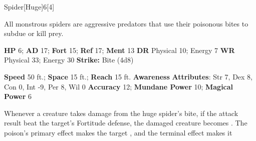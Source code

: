   \begin{monsection}{Spider}[Huge]{6}[4]
    \vspace{-1em}\vspace{-1em}
    \vspace{0em}

    
    All monstrous spiders are aggressive predators that use their poisonous bites to subdue or kill prey.
  

    \begin{spellcontent}
      \begin{spelltargetinginfo}
        \pari \textbf{HP} 6;
          \textbf{AD} 17;
          \textbf{Fort} 15;
          \textbf{Ref} 17;
          \textbf{Ment} 13
        \pari \textbf{DR} Physical 10; Energy 7
        \pari \textbf{WR} Physical 33; Energy 30
        \pari \textbf{Strike:}
            Bite  (4d8)
      \end{spelltargetinginfo}
    \end{spellcontent}
    \begin{monsterfooter}
      \pari \textbf{Speed} 50 ft.;
        \textbf{Space} 15 ft.;
        \textbf{Reach} 15 ft.
      \pari \textbf{Awareness} 
      \pari \textbf{Attributes}:
        Str 7, Dex 8,
        Con 0, Int -9,
        Per 8, Wil 0
      \pari \textbf{Accuracy} 12;
        \textbf{Mundane Power} 10;
      \textbf{Magical Power} 6
    \end{monsterfooter}
  \end{monsection}
    Whenever a creature takes damage from the huge spider's bite,
      if the attack result beat the target's Fortitude defense,
      the damaged creature becomes .
    The poison's primary effect makes the target , and the terminal effect makes it 
  

